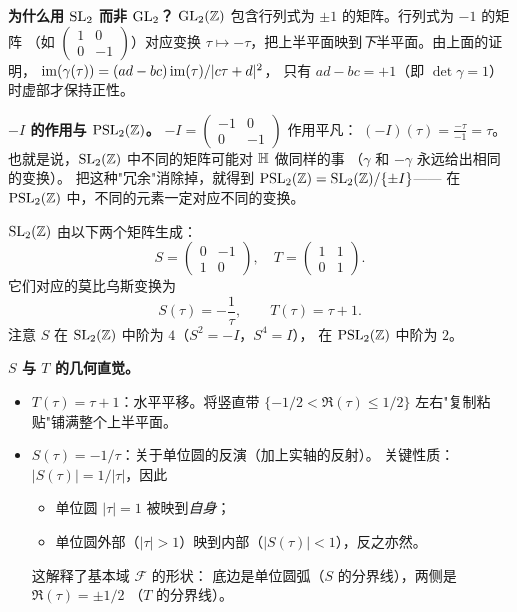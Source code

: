 \textbf{为什么用 $\mathrm{SL}_2$ 而非 $\mathrm{GL}_2$？}
$\mathrm{GL}_2(\mathbb{Z})$ 包含行列式为 $\pm 1$ 的矩阵。行列式为 $-1$ 的矩阵
（如 $\begin{pmatrix} 1 & 0 \\ 0 & -1 \end{pmatrix}$）对应变换
$\tau \mapsto -\tau$，把上半平面映到\emph{下}半平面。由上面的证明，
$\operatorname{im}(\gamma(\tau)) = (ad - bc)\operatorname{im}(\tau)/|c\tau + d|^2$，
只有 $ad - bc = +1$（即 $\det \gamma = 1$）时虚部才保持正性。

\textbf{$-I$ 的作用与 $\mathrm{PSL}_2(\mathbb{Z})$。}
$-I = \begin{pmatrix} -1 & 0 \\ 0 & -1 \end{pmatrix}$ 作用平凡：
$(-I)(\tau) = \frac{-\tau}{-1} = \tau$。
也就是说，$\SL_2(\Z)$ 中不同的矩阵可能对 $\mathbb{H}$ 做同样的事
（$\gamma$ 和 $-\gamma$ 永远给出相同的变换）。
把这种"冗余"消除掉，就得到
$\mathrm{PSL}_2(\mathbb{Z}) = \mathrm{SL}_2(\mathbb{Z})/\{\pm I\}$——
在 $\mathrm{PSL}_2(\mathbb{Z})$ 中，不同的元素一定对应不同的变换。

\begin{theorem}[$\SL_2(\Z)$ 的生成元]
\label{thm:sl2z-generators}
$\SL_2(\Z)$ 由以下两个矩阵生成：
\[
  S = \begin{pmatrix} 0 & -1 \\ 1 & 0 \end{pmatrix}, \quad
  T = \begin{pmatrix} 1 & 1 \\ 0 & 1 \end{pmatrix}.
\]
它们对应的莫比乌斯变换为
\[
  S(\tau) = -\frac{1}{\tau}, \qquad T(\tau) = \tau + 1.
\]
注意 $S$ 在 $\SL_2(\Z)$ 中阶为 $4$（$S^2 = -I$，$S^4 = I$），
在 $\mathrm{PSL}_2(\mathbb{Z})$ 中阶为 $2$。
\end{theorem}

\textbf{$S$ 与 $T$ 的几何直觉。}
\label{rem:S-T-geometry}
\begin{itemize}
  \item $T(\tau) = \tau + 1$：水平平移。将竖直带
    $\{-1/2 < \Re(\tau) \leq 1/2\}$ 左右"复制粘贴"铺满整个上半平面。
  \item $S(\tau) = -1/\tau$：关于单位圆的反演（加上实轴的反射）。
    关键性质：$|S(\tau)| = 1/|\tau|$，因此
    \begin{itemize}
      \item 单位圆 $|\tau| = 1$ 被映到\emph{自身}；
      \item 单位圆外部（$|\tau| > 1$）映到内部（$|S(\tau)| < 1$），反之亦然。
    \end{itemize}
    这解释了基本域 $\mathcal{F}$ 的形状：
    底边是单位圆弧（$S$ 的分界线），两侧是 $\Re(\tau) = \pm 1/2$
    （$T$ 的分界线）。
\end{itemize}

